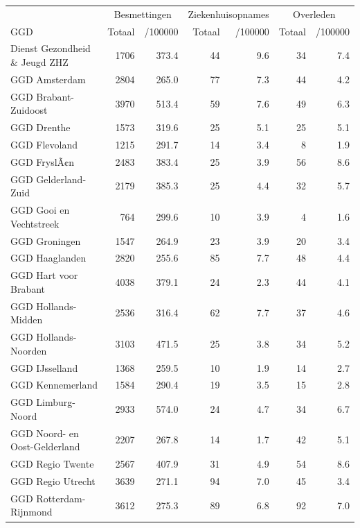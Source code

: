 \documentclass[
  english,
  man,floatsintext]{apa6}
\begin{document}
\begin{table}[H]
\centering\begingroup\fontsize{10}{12}\selectfont

\begin{threeparttable}
\begin{tabular}{lrrrrrr}
\toprule
\multicolumn{1}{c}{ } & \multicolumn{2}{c}{Besmettingen} & \multicolumn{2}{c}{Ziekenhuisopnames} & \multicolumn{2}{c}{Overleden} \\
\cmidrule(l{3pt}r{3pt}){2-3} \cmidrule(l{3pt}r{3pt}){4-5} \cmidrule(l{3pt}r{3pt}){6-7}
GGD & Totaal & /100000 & Totaal & /100000 & Totaal & /100000\\
\midrule
Dienst Gezondheid \& Jeugd ZHZ & 1706 & 373.4 & 44 & 9.6 & 34 & 7.4\\
GGD Amsterdam & 2804 & 265.0 & 77 & 7.3 & 44 & 4.2\\
GGD Brabant-Zuidoost & 3970 & 513.4 & 59 & 7.6 & 49 & 6.3\\
GGD Drenthe & 1573 & 319.6 & 25 & 5.1 & 25 & 5.1\\
GGD Flevoland & 1215 & 291.7 & 14 & 3.4 & 8 & 1.9\\
GGD FryslÃ¢n & 2483 & 383.4 & 25 & 3.9 & 56 & 8.6\\
GGD Gelderland-Zuid & 2179 & 385.3 & 25 & 4.4 & 32 & 5.7\\
GGD Gooi en Vechtstreek & 764 & 299.6 & 10 & 3.9 & 4 & 1.6\\
GGD Groningen & 1547 & 264.9 & 23 & 3.9 & 20 & 3.4\\
GGD Haaglanden & 2820 & 255.6 & 85 & 7.7 & 48 & 4.4\\
GGD Hart voor Brabant & 4038 & 379.1 & 24 & 2.3 & 44 & 4.1\\
GGD Hollands-Midden & 2536 & 316.4 & 62 & 7.7 & 37 & 4.6\\
GGD Hollands-Noorden & 3103 & 471.5 & 25 & 3.8 & 34 & 5.2\\
GGD IJsselland & 1368 & 259.5 & 10 & 1.9 & 14 & 2.7\\
GGD Kennemerland & 1584 & 290.4 & 19 & 3.5 & 15 & 2.8\\
GGD Limburg-Noord & 2933 & 574.0 & 24 & 4.7 & 34 & 6.7\\
GGD Noord- en Oost-Gelderland & 2207 & 267.8 & 14 & 1.7 & 42 & 5.1\\
GGD Regio Twente & 2567 & 407.9 & 31 & 4.9 & 54 & 8.6\\
GGD Regio Utrecht & 3639 & 271.1 & 94 & 7.0 & 45 & 3.4\\
GGD Rotterdam-Rijnmond & 3612 & 275.3 & 89 & 6.8 & 92 & 7.0\\

\end{tabular}
\end{threeparttable}
\end{table}
\end{document}
